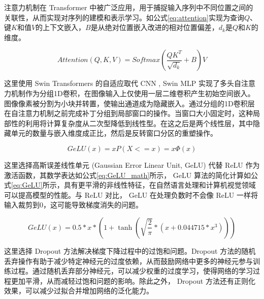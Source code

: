\documentclass[final,1p,12pt,UTF8,review]{elsarticle}
\begin{document}
\par
注意力机制在 Transformer 中被广泛应用，用于捕捉输入序列中不同位置之间的关联性，从而实现对序列的建模和表示学习。如公式\ref{eq:attention}实现为查询$Q$、键$K$和值$V$的上下文嵌入，$B$是从绝对位置嵌入改进的相对位置偏差，$d_k$是$Q$和$K$的维度。
\begin{figure}[htp]
    \begin{equation}
        \label{eq:attention}
        Attention(Q,K,V) = Softmax\left(\frac{QK^T}{\sqrt{d_k}}+B\right)V
    \end{equation}
\end{figure}

\par
这里使用 Swin Transformers 的自适应取代 CNN ,  Swin MLP 实现了多头自注意力机制作为分组1D卷积，在图像输入上仅使用一层二维卷积产生初始空间嵌入。图像像素被分割为小块并转置，使输出通道成为隐藏嵌入。通过分组的1D卷积层在自注意力机制之前完成补丁分组到局部窗口的操作。当窗口大小固定时，这种局部性的利用将计算复杂度从二次型降低到线性型。在这之后是两个线性层，其中隐藏单元的数量与嵌入维度成正比，然后是反转窗口分区的重塑操作。

\begin{figure}[htp]
    \begin{equation}
        \label{eq:GeLU_math}
        GeLU(x) = xP(X<=x)=x\Phi(x)
    \end{equation}
\end{figure}

\par
这里选择高斯误差线性单元 (Gaussian Error Linear Unit, GeLU) 代替 ReLU 作为激活函数，其数学表达如公式\ref{eq:GeLU_math}所示， GeLU 算法的简化计算如公式\ref{eq:GeLU}所示，具有更平滑的非线性特征，在自然语言处理和计算机视觉领域可以提高模型的性能。与 ReLU 对比， GeLU 在处理负数时不会像 ReLU 一样将输入裁剪到0，这可能导致梯度消失的问题。
\begin{figure}[htp]
    \begin{equation}
        \label{eq:GeLU}
        GeLU(x) = 0.5 * x * (1 + \tanh(\sqrt{\frac{2}{\pi}} * (x + 0.044715 * x^3)))
    \end{equation}
\end{figure}

\par
这里选择 Dropout 方法解决梯度下降过程中的过饱和问题。Dropout 方法的随机丢弃操作有助于减少特定神经元的过度依赖，从而鼓励网络中更多的神经元参与训练过程。通过随机丢弃部分神经元，可以减少权重的过度学习，使得网络的学习过程更加平滑，从而减轻过饱和问题的影响。除此之外， Dropout 方法还有正则化效果，可以减少过拟合并增加网络的泛化能力。
\end{document}

